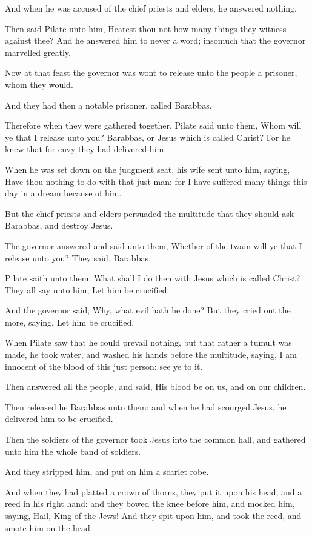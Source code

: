 \verse And when he was accused of the chief priests and elders, he answered nothing.

\verse Then said Pilate unto him, Hearest thou not how many things they witness against thee?  \verse And he answered him to never a word; insomuch that the governor marvelled greatly.

\verse Now at that feast the governor was wont to release unto the people a prisoner, whom they would.

\verse And they had then a notable prisoner, called Barabbas.

\verse Therefore when they were gathered together, Pilate said unto them, Whom will ye that I release unto you? Barabbas, or Jesus which is called Christ?  \verse For he knew that for envy they had delivered him.

\verse When he was set down on the judgment seat, his wife sent unto him, saying, Have thou nothing to do with that just man: for I have suffered many things this day in a dream because of him.

\verse But the chief priests and elders persuaded the multitude that they should ask Barabbas, and destroy Jesus.

\verse The governor answered and said unto them, Whether of the twain will ye that I release unto you? They said, Barabbas.

\verse Pilate saith unto them, What shall I do then with Jesus which is called Christ? They all say unto him, Let him be crucified.

\verse And the governor said, Why, what evil hath he done? But they cried out the more, saying, Let him be crucified.

\verse When Pilate saw that he could prevail nothing, but that rather a tumult was made, he took water, and washed his hands before the multitude, saying, I am innocent of the blood of this just person: see ye to it.

\verse Then answered all the people, and said, His blood be on us, and on our children.

\verse Then released he Barabbas unto them: and when he had scourged Jesus, he delivered him to be crucified.

\verse Then the soldiers of the governor took Jesus into the common hall, and gathered unto him the whole band of soldiers.

\verse And they stripped him, and put on him a scarlet robe.

\verse And when they had platted a crown of thorns, they put it upon his head, and a reed in his right hand: and they bowed the knee before him, and mocked him, saying, Hail, King of the Jews!  \verse And they spit upon him, and took the reed, and smote him on the head.

